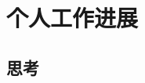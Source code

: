 \documentclass[letterpaper,12pt]{article}
\begin{document}
%		
%	
%	
	
	\section{个人工作进展}
	
%	
%	
%	
	
	\subsection{思考}
	
\end{document}
